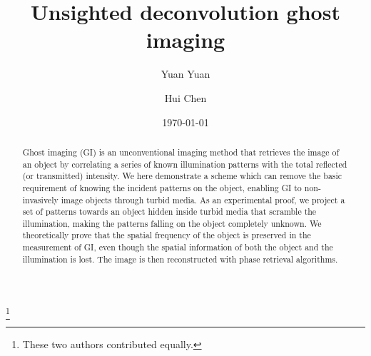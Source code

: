 \documentclass[amsmath,amssymb,aps,prl,groupedaddress,floatfix,12pt]{revtex4-1}
\begin{document}

\title{Unsighted deconvolution ghost imaging}

\author{Yuan Yuan}
\author{Hui Chen}
\thanks{These two authors contributed equally.}


\date{\today}


\begin{abstract}
Ghost imaging (GI) is an unconventional imaging method that retrieves the image of an object by correlating a series of known illumination patterns with the total reflected (or transmitted) intensity. We here demonstrate a scheme which can remove the basic requirement of knowing the incident patterns on the object, enabling GI to non-invasively image objects through turbid media. As an experimental proof, we project a set of patterns towards an object hidden inside turbid media that scramble the illumination, making the patterns falling on the object completely unknown. We theoretically prove that the spatial frequency of the object is preserved in the measurement of GI, even though the spatial information of both the object and the illumination is lost. The image is then reconstructed with phase retrieval algorithms. 
\end{abstract}
\end{document}
